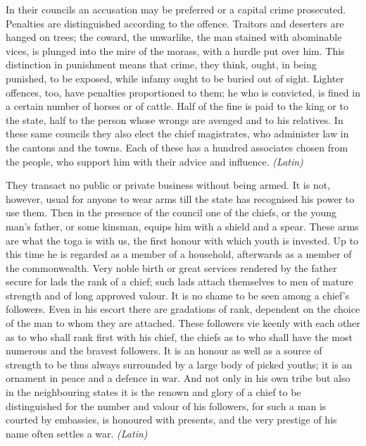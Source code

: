 
In their councils an accusation may be preferred or a capital crime prosecuted. Penalties are distinguished according to the offence. Traitors and deserters are hanged on trees; the coward, the unwarlike, the man stained with abominable vices, is plunged into the mire of the morass, with a hurdle put over him. This distinction in punishment means that crime, they think, ought, in being punished, to be exposed, while infamy ought to be buried out of sight. Lighter offences, too, have penalties proportioned to them; he who is convicted, is fined in a certain number of horses or of cattle. Half of the fine is paid to the king or to the state, half to the person whose wrongs are avenged and to his relatives. In these same councils they also elect the chief magistrates, who administer law in the cantons and the towns. Each of these has a hundred associates chosen from the people, who support him with their advice and influence. \emph{(Latin)}


They transact no public or private business without being armed. It is not, however, usual for anyone to wear arms till the state has recognised his power to use them. Then in the presence of the council one of the chiefs, or the young man's father, or some kinsman, equips him with a shield and a spear. These arms are what the toga is with us, the first honour with which youth is invested. Up to this time he is regarded as a member of a household, afterwards as a member of the commonwealth. Very noble birth or great services rendered by the father secure for lads the rank of a chief; such lads attach themselves to men of mature strength and of long approved valour. It is no shame to be seen among a chief's followers. Even in his escort there are gradations of rank, dependent on the choice of the man to whom they are attached. These followers vie keenly with each other as to who shall rank first with his chief, the chiefs as to who shall have the most numerous and the bravest followers. It is an honour as well as a source of strength to be thus always surrounded by a large body of picked youths; it is an ornament in peace and a defence in war. And not only in his own tribe but also in the neighbouring states it is the renown and glory of a chief to be distinguished for the number and valour of his followers, for such a man is courted by embassies, is honoured with presents, and the very prestige of his name often settles a war. \emph{(Latin)}

